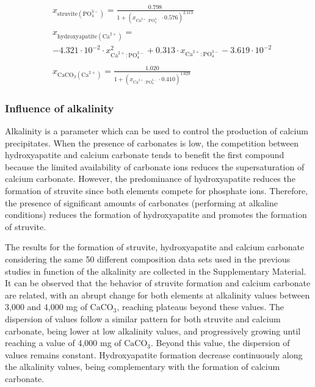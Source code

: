 \begin{refsection}[referencesCh3]
\begin{align}
&x_{\text{struvite} \left(\text{PO}_{4}^{3-}\right) }= \frac{0.798}{1+\left(x_{\text{Ca}^{2+}:\text{PO}_{4}^{3-}} \cdot 0.576\right)^{2.113}} \label{eq:sigmoidal_Ca_StrYieldPaperGeo} \\
\nonumber \\
& x_{\text{hydroxyapatite} \left(\text{Ca}^{2+}\right)} = \label{eq:sigmoidal_Ca_HAP} \\
& -4.321 \cdot 10^{-2} \cdot x_{\text{Ca}^{2+}:\text{PO}_{4}^{3-}}^{2} + 0.313 \cdot x_{\text{Ca}^{2+}:\text{PO}_{4}^{3-}} - 3.619 \cdot 10^{-2} \nonumber 
\\
\nonumber \\
&  x_{\text{CaCO}_{3} \left(\text{Ca}^{2+}\right)} = \frac{1.020}{1+\left(x_{\text{Ca}^{2+}:\text{PO}_{4}^{3-}} \cdot 0.410 \right)^{1.029}} \label{eq:sigmoidal_CaCaCO3}
\end{align}

\subsubsection{Influence of alkalinity}
Alkalinity is a parameter which can be used to control the production of calcium precipitates. When the presence of carbonates is low, the competition between hydroxyapatite and calcium carbonate tends to benefit the first compound because the limited availability of carbonate ions reduces the supersaturation of calcium carbonate. However, the predominance of hydroxyapatite reduces the formation of struvite since both elements compete for phosphate ions. Therefore, the presence of significant amounts of carbonates (performing at alkaline conditions) reduces the formation of hydroxyapatite and promotes the formation of struvite. 

The results for the formation of struvite, hydroxyapatite and calcium carbonate considering the same 50 different composition data sets used in the previous studies  in function of the alkalinity are collected in the Supplementary Material.
It can be observed that the behavior of struvite formation and calcium carbonate are related, with an abrupt change for both elements at alkalinity values between 3,000 and 4,000 mg of $\text{CaCO}_{3}$, reaching plateaus beyond these values. The dispersion of values follow a similar pattern for both struvite and calcium carbonate, being lower at low alkalinity values, and progressively growing until reaching a value of 4,000 mg of $\text{CaCO}_{3}$. Beyond this value, the dispersion of  values remains constant. Hydroxyapatite formation decrease continuously along the alkalinity values, being complementary with the formation of calcium carbonate.


\end{refsection}

